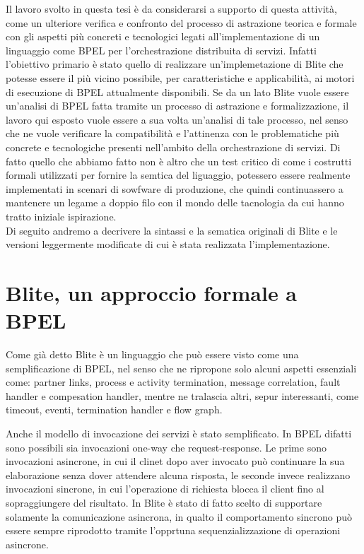 Il lavoro svolto in questa tesi è da considerarsi a supporto di questa attività,
come un ulteriore verifica e confronto del processo di astrazione teorica e
formale con gli aspetti più concreti e tecnologici legati all'implementazione di
un linguaggio come BPEL per l'orchestrazione distribuita di servizi. Infatti
l'obiettivo primario è stato quello di realizzare un'implemetazione di Blite che
potesse essere il più vicino possibile, per caratteristiche e applicabilità, ai
motori di esecuzione di BPEL attualmente disponibili. Se da un lato Blite vuole
essere un'analisi di BPEL fatta tramite un processo di astrazione e
formalizzazione, il lavoro qui esposto vuole essere a sua volta un'analisi di
tale processo, nel senso che ne vuole verificare la compatibilità e l'attinenza
con le problematiche più concrete e tecnologiche presenti nell'ambito della
orchestrazione di servizi. Di fatto quello che abbiamo fatto non è altro che un
test critico di come i costrutti formali utilizzati per fornire la semtica del
liguaggio, potessero essere realmente implementati in scenari di sowfware di
produzione, che quindi continuassero a mantenere un legame a doppio filo con il
mondo delle tacnologia da cui hanno tratto iniziale ispirazione.
\\

Di seguito andremo a decrivere la sintassi e  la sematica originali di Blite e
le versioni leggermente modificate di cui è stata realizzata l'implementazione.

\section{Blite, un approccio formale a BPEL}

Come già detto Blite è un linguaggio che può essere visto come una
semplificazione di BPEL, nel senso che ne ripropone solo alcuni aspetti
essenziali come: partner links, process e activity termination, message
correlation, fault handler e compesation handler, mentre ne tralascia altri,
sepur interessanti, come timeout, eventi, termination handler e flow graph. 

Anche il modello di invocazione dei servizi è stato semplificato. In BPEL difatti
sono possibili sia invocazioni one-way che request-response. Le prime sono
invocazioni asincrone, in cui il clinet dopo aver invocato può continuare la sua
elaborazione senza dover attendere alcuna risposta, le seconde invece realizzano
invocazioni sincrone, in cui l'operazione di richiesta blocca il client fino al
sopraggiungere del risultato. In Blite è stato di fatto scelto di supportare
solamente la comunicazione asincrona, in qualto il comportamento sincrono può
essere sempre riprodotto tramite l'opprtuna sequenzializzazione di operazioni
asincrone.

